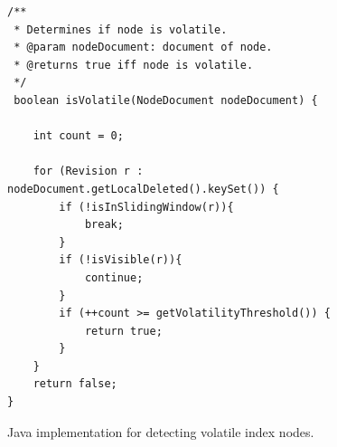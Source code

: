 \documentclass[abstracton,12pt]{scrreprt}
\begin{document}
\begin{figure}[h]
    \begin{framed}
        \begin{scriptsize}
            \begin{verbatim}
/**
 * Determines if node is volatile.
 * @param nodeDocument: document of node.
 * @returns true iff node is volatile.
 */            
 boolean isVolatile(NodeDocument nodeDocument) {

    int count = 0;
    
    for (Revision r : nodeDocument.getLocalDeleted().keySet()) {
        if (!isInSlidingWindow(r)){
            break;
        }
        if (!isVisible(r)){
            continue;
        }
        if (++count >= getVolatilityThreshold()) {
            return true;
        }
    }
    return false;
}
            \end{verbatim}
        \end{scriptsize}
    \end{framed}
    \caption{Java implementation for detecting volatile index nodes.}
    \label{algo:is_volatile}
\end{figure}
\end{document}
